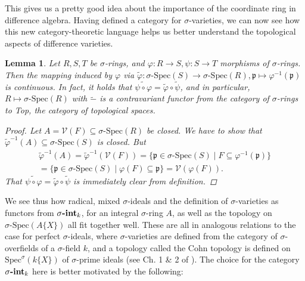 \documentclass{article}
\def\V{\mathcal{V}}
\def\p{\mathfrak{p}}
\def\s{\sigma}
\def\Spec{\text{Spec}}
\def\sSpec{\sigma\text{-Spec}}
\newcommand{\catname}[1]{{\normalfont\textbf{#1}}}
\newcommand{\sintk}{\s\text{\catname{-int}}_k}
\newenvironment{bew}{\begin{proof}[Proof]}{\end{proof}}
\theoremstyle{plain}
\newtheorem{lem}[Satz]{Lemma}
\theoremstyle{definition}
\begin{document}
This gives us a pretty good idea about the importance of the coordinate ring in difference algebra.
Having defined a category for $\s$-varieties, we can now see how this new category-theoretic language helps us better understand the topological aspects of difference varieties.

\begin{lem}\label{inducedcont}
Let $R,S,T$ be $\s$-rings, and $\varphi: R \rightarrow S, \psi: S \rightarrow T$ morphisms of $\s$-rings. Then the mapping induced by $\varphi$ via $\tilde \varphi: \sSpec(S) \rightarrow \sSpec(R), \p \mapsto \varphi^{-1}(\p)$ is continuous. 
In fact, it holds that $\widetilde{ \psi \circ \varphi} = \tilde \varphi \circ \tilde \psi$, and in particular, $R \mapsto \sSpec(R)$ with $\tilde -$ is a contravariant functor from the category of $\s$-rings to Top, the category of topological spaces.
\begin{bew}
Let $A = \V(F) \subseteq \sSpec(R)$ be closed. We have to show that $\tilde \varphi^{-1}(A) \subseteq \sSpec(S)$ is closed.
But 
\begin{align*} \tilde \varphi^{-1}(A) = \tilde \varphi^{-1}(\V(F)) = \{ \p \in \sSpec(S) \mid F \subseteq \varphi^{-1}(\p) \} \\ = \{\p \in \sSpec(S) \mid \varphi(F) \subseteq \p \} = \V(\varphi(F)). \end{align*}
That $\widetilde{ \psi \circ \varphi} = \tilde \varphi \circ \tilde \psi$ is immediately clear from definition.
\end{bew}
\end{lem}

We see thus how radical, mixed $\s$-ideals and the definition of $\s$-varieties as functors from $\sintk$, for an integral $\s$-ring $A$, as well as the topology on $\sSpec(A\{X\})$ all fit together well. 
These are all in analogous relations to the case for perfect $\s$-ideals, where $\s$-varieties are defined from the category of $\s$-overfields of a $\s$-field $k$, and a topology called the Cohn topology is defined on $\Spec^\s(k\{X\})$ of $\s$-prime ideals (see Ch. 1 \& 2 of \cite{wibmer}).
The choice for the category $\sintk$ here is better motivated by the following:
\end{document}
